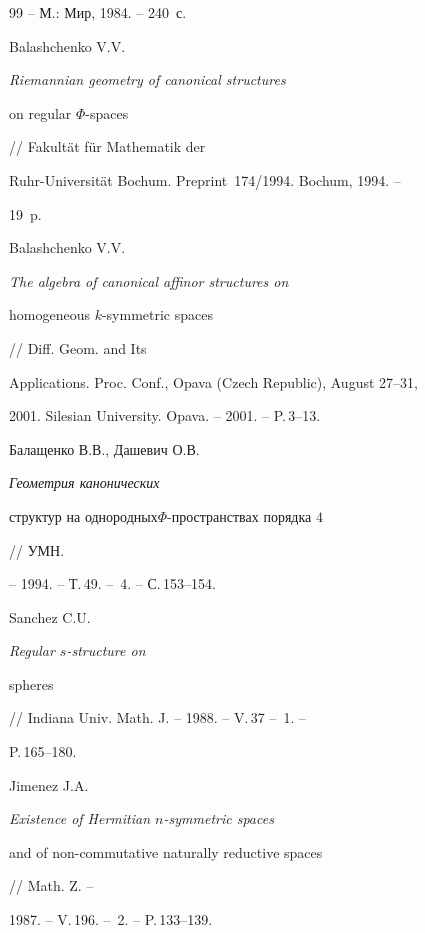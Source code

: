 \begin{thebibliography}{99}
-- М.: Мир, 1984. -- 240~с.





 Balashchenko V.V. {\it Riemannian geometry of canonical structures


on regular $\Phi$-spaces} // Fakult\"at f\"ur Mathematik der


Ruhr-Universit\"at Bochum. Preprint \No\,174/1994. Bochum, 1994. --


19~p.





 Balashchenko V.V. {\it The algebra of canonical affinor structures on


homogeneous $k$-symmetric spaces} // Diff. Geom. and Its


Applications. Proc. Conf., Opava (Czech Republic), August 27--31,


2001. Silesian University. Opava. -- 2001. -- P.\,3--13.





 Балащенко В.В., Дашевич О.В. {\it Геометрия канонических


структур на однородных\linebreak $\Phi$-пространствах порядка $4$} // УМН.


-- 1994. -- Т.\,49. -- \No\,4. -- С.\,153--154.





 Sanchez C.U. {\it Regular $s$-structure on


spheres} // Indiana Univ. Math. J. -- 1988. -- V.\,37 -- \No\,1. --


P.\,165--180.





 Jimenez J.A. {\it Existence of Hermitian $n$-symmetric spaces


and of non-commutative naturally reductive spaces} // Math. Z. --


1987. -- V.\,196. -- \No\,2. -- P.\,133--139.





\end{thebibliography}





\vskip 1cm












\label{end}














